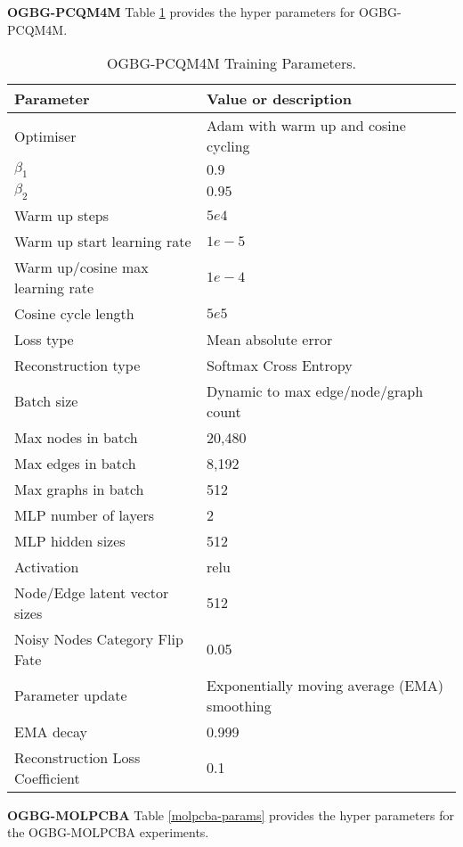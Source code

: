 \documentclass{article} \usepackage{iclr2022_conference,times}
\begin{document}
\textbf{OGBG-PCQM4M} Table \ref{pcqm4m-params} provides the hyper parameters for OGBG-PCQM4M.
\begin{table}[]
\caption{OGBG-PCQM4M Training Parameters.}
    \label{pcqm4m-params}
    \centering
    \begin{tabular}{ll}
      \toprule
       Parameter & Value or description \\
       \midrule
       Optimiser & Adam with warm up and cosine cycling \\
       $\beta_1$   & $0.9$ \\              
       $\beta_2$   & $0.95$ \\                     
       Warm up steps    & $5e4$ \\
       Warm up start learning rate    & $1e-5$ \\       
       Warm up/cosine max learning rate    & $1e-4$ \\       
       Cosine cycle length    & $5e5$ \\       
       Loss type & Mean absolute error \\
       Reconstruction type & Softmax Cross Entropy \\
     \midrule
       Batch size & Dynamic to max edge/node/graph count \\
       Max nodes in batch & 20,480 \\
       Max edges in batch & 8,192 \\   
       Max graphs in batch & 512 \\    
     \midrule
       MLP number of layers & 2 \\
       MLP hidden sizes & 512 \\
       Activation & relu \\
       Node/Edge latent vector sizes & 512 \\ 
     \midrule
      
       Noisy Nodes Category Flip Fate & 0.05 \\
       Parameter update & Exponentially moving average (EMA) smoothing \\
       EMA decay & 0.999 \\
       Reconstruction Loss Coefficient & 0.1 \\
    \bottomrule

\end{tabular}
\end{table}


\textbf{OGBG-MOLPCBA} Table \ref{molpcba-params} provides the hyper parameters for the OGBG-MOLPCBA experiments.
\end{document}
